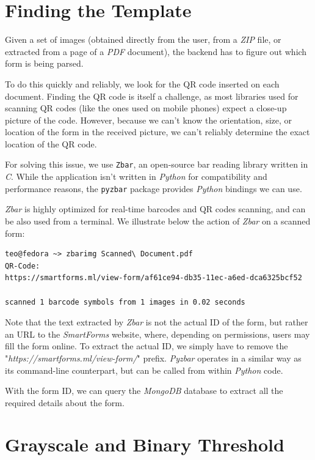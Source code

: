 \documentclass[11pt, a4paper]{report}
\def\code#1{\texttt{#1}}
\begin{document}
\section{Finding the Template}

Given a set of images (obtained directly from the user, from a \textit{ZIP} file, or extracted from a page of a \textit{PDF} document), the backend has to figure out which form is being parsed.

To do this quickly and reliably, we look for the QR code inserted on each document. Finding the QR code is itself a challenge, as most libraries used for scanning QR codes (like the ones used on mobile phones) expect a close-up picture of the code. However, because we can't know the orientation, size, or location of the form in the received picture, we can't reliably determine the exact location of the QR code.

For solving this issue, we use \code{Zbar}, an open-source bar reading library written in \textit{C}. While the application isn't written in \textit{Python} for compatibility and performance reasons, the \code{pyzbar} package provides \textit{Python} bindings we can use.

\textit{Zbar} is highly optimized for real-time barcodes and QR codes scanning, and can be also used from a terminal. We illustrate below the action of \textit{Zbar} on a scanned form:


\begin{verbatim}
teo@fedora ~> zbarimg Scanned\ Document.pdf 
QR-Code:
https://smartforms.ml/view-form/af61ce94-db35-11ec-a6ed-dca6325bcf52

scanned 1 barcode symbols from 1 images in 0.02 seconds
\end{verbatim}

Note that the text extracted by \textit{Zbar} is not the actual ID of the form, but rather an URL to the \textit{SmartForms} website, where, depending on permissions, users may fill the form online. To extract the actual ID, we simply have to remove the "\textit{https://smartforms.ml/view-form/}" prefix. \textit{Pyzbar} operates in a similar way as its command-line counterpart, but can be called from within \textit{Python} code.

With the form ID, we can query the \textit{MongoDB} database to extract all the required details about the form.

\section{Grayscale and Binary Threshold}
\end{document}
